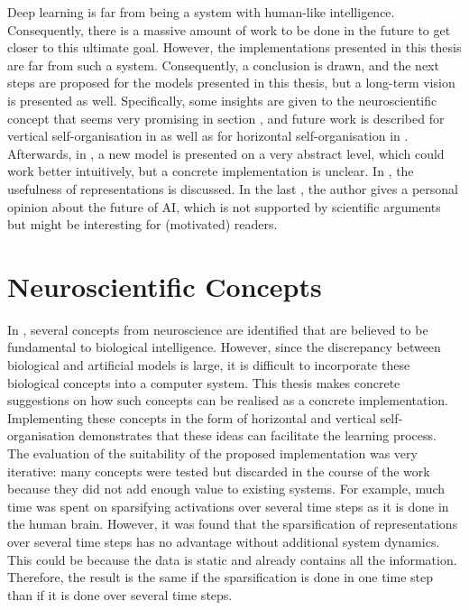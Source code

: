 
Deep learning is far from being a system with human-like intelligence. Consequently, there is a massive amount of work to be done in the future to get closer to this ultimate goal. However, the implementations presented in this thesis are far from such a system. Consequently, a conclusion is drawn, and the next steps are proposed for the models presented in this thesis, but a long-term vision is presented as well. Specifically, some insights are given to the neuroscientific concept that seems very promising in section , and future work is described for vertical self-organisation in  as well as for horizontal self-organisation in . Afterwards, in , a new model is presented on a very abstract level, which could work better intuitively, but a concrete implementation is unclear. In , the usefulness of representations is discussed. In the last , the author gives a personal opinion about the future of AI, which is not supported by scientific arguments but might be interesting for (motivated) readers.



\section{Neuroscientific Concepts}
In , several concepts from neuroscience are identified that are believed to be fundamental to biological intelligence. However, since the discrepancy between biological and artificial models is large, it is difficult to incorporate these biological concepts into a computer system. This thesis makes concrete suggestions on how such concepts can be realised as a concrete implementation. Implementing these concepts in the form of horizontal and vertical self-organisation demonstrates that these ideas can facilitate the learning process. The evaluation of the suitability of the proposed implementation was very iterative: many concepts were tested but discarded in the course of the work because they did not add enough value to existing systems. For example, much time was spent on sparsifying activations over several time steps as it is done in the human brain. However, it was found that the sparsification of representations over several time steps has no advantage without additional system dynamics. This could be because the data is static and already contains all the information. Therefore, the result is the same if the sparsification is done in one time step than if it is done over several time steps.

